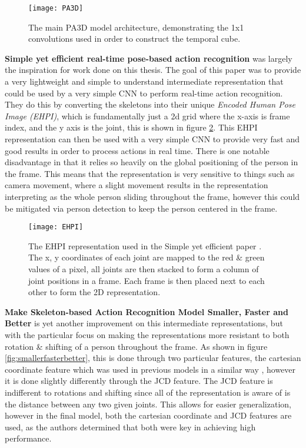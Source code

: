 \begin{figure}[h]
	\texttt{[image: PA3D]}
	\centering
	\caption{The main PA3D \cite{PA3D} model architecture, demonstrating the 1x1 convolutions used in order to construct the temporal cube.}
	\label{fig:PA3D}
\end{figure}

\textbf{Simple yet efficient real-time pose-based action recognition} \cite{simple_yet_efficient} was largely the inspiration for work done on this thesis. The goal of this paper was to provide a very lightweight and simple to understand intermediate representation that could be used by a very simple CNN to perform real-time action recognition. They do this by converting the skeletons into their unique \textit{Encoded Human Pose Image (EHPI)}, which is fundamentally just a 2d grid where the x-axis is frame index, and the y axis is the joint, this is shown in figure \ref{fig:EHPI}. This EHPI representation can then be used with a very simple CNN to provide very fast and good results in order to process actions in real time. There is one notable disadvantage in that it relies so heavily on the global positioning of the person in the frame. This means that the representation is very sensitive to things such as camera movement, where a slight movement results in the representation interpreting as the whole person sliding throughout the frame, however this could be mitigated via person detection to keep the person centered in the frame.

\begin{figure}[h]
	\texttt{[image: EHPI]}
	\centering
	\caption{The EHPI representation used in the Simple yet efficient paper \cite{simple_yet_efficient}. The x, y coordinates of each joint are mapped to the red \& green values of a pixel, all joints are then stacked to form a column of joint positions in a frame. Each frame is then placed next to each other to form the 2D representation.}
	\label{fig:EHPI}
\end{figure}

\textbf{Make Skeleton-based Action Recognition Model Smaller, Faster and Better} \cite{smaller_faster_better} is yet another improvement on this intermediate representations, but with the particular focus on making the representations more resistant to both rotation \& shifting of a person throughout the frame.  As shown in figure \ref{fig:smallerfasterbetter}, this is done through two particular features, the cartesian coordinate feature which was used in previous models in a similar way \cite{simple_yet_efficient}, however it is done slightly differently through the JCD feature. The JCD feature is indifferent to rotations and shifting since all of the representation is aware of is the distance between any two given joints. This allows for easier generalization, however in the final model, both the cartesian coordinate and JCD features are used, as the authors determined that both were key in achieving high performance.

